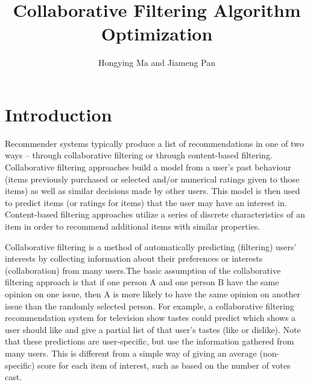 \documentclass{acmtog} %
\begin{document}

\title{Collaborative Filtering Algorithm Optimization} %

\author{Hongying Ma {\upshape and} Jiameng Pan
}

\maketitle

\section{Introduction}
Recommender systems typically produce a list of recommendations in one of two ways\cite{jafarkarimi2012naive} – through collaborative filtering or through content-based filtering. Collaborative filtering approaches build a model from a user's past behaviour (items previously purchased or selected and/or numerical ratings given to those items) as well as similar decisions made by other users. This model is then used to predict items (or ratings for items) that the user may have an interest in. Content-based filtering approaches utilize a series of discrete characteristics of an item in order to recommend additional items with similar properties. 

Collaborative filtering is a method of automatically predicting (filtering) users' interests by collecting information about their preferences or interests (collaboration) from many users.The basic assumption of the collaborative filtering approach is that if one person A and one person B have the same opinion on one issue, then A is more likely to have the same opinion on another issue than the randomly selected person. For example, a collaborative filtering recommendation system for television show tastes could predict which shows a user should like and give a partial list of that user's tastes (like or dislike). Note that these predictions are user-specific, but use the information gathered from many users. This is different from a simple way of giving an average (non-specific) score for each item of interest, such as based on the number of votes cast.
\end{document}

